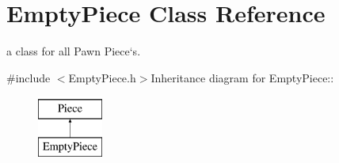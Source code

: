 \hypertarget{classEmptyPiece}{
\section{EmptyPiece Class Reference}
\label{classEmptyPiece}
}


a class for all Pawn Piece`s.  


{\ttfamily \#include $<$EmptyPiece.h$>$}Inheritance diagram for EmptyPiece::\begin{figure}[H]
\begin{center}
\leavevmode
\includegraphics[height=2cm]{classEmptyPiece}
\end{center}
\end{figure}
